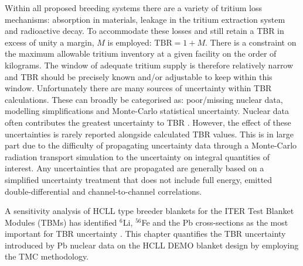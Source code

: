 Within all proposed breeding systems there are a variety of tritium loss mechanisms: absorption in materials, leakage in the tritium extraction system and radioactive decay. To accommodate these losses and still retain a TBR in excess of unity a margin, $M$ is employed: $\mathrm{TBR} = 1 + M$. There is a constraint on the maximum allowable tritium inventory at a given facility on the order of kilograms. The window of adequate tritium supply is therefore relatively narrow and TBR should be precisely known and/or adjustable to keep within this window. Unfortunately there are many sources of uncertainty within TBR calculations. These can broadly be categorised as: poor/missing nuclear data, modelling simplifications and Monte-Carlo statistical uncertainty. Nuclear data often contributes the greatest uncertainty to TBR \cite{El-Guebaly2009}. However, the effect of these uncertainties is rarely reported alongside calculated TBR values. This is in large part due to the difficulty of propagating uncertainty data through a Monte-Carlo radiation transport simulation to the uncertainty on integral quantities of interest. Any uncertainties that are propagated are generally based on a simplified uncertainty treatment that does not include full energy, emitted double-differential and channel-to-channel correlations. 


A sensitivity analysis of HCLL type breeder blankets for the ITER Test Blanket Modules (TBMs) has identified $^{6}$Li, $^{56}$Fe and the Pb cross-sections as the most important for TBR uncertainty \cite{Leichtle2011}. This chapter quantifies the TBR uncertainty introduced by Pb nuclear data on the HCLL DEMO blanket design by employing the TMC methodology.


